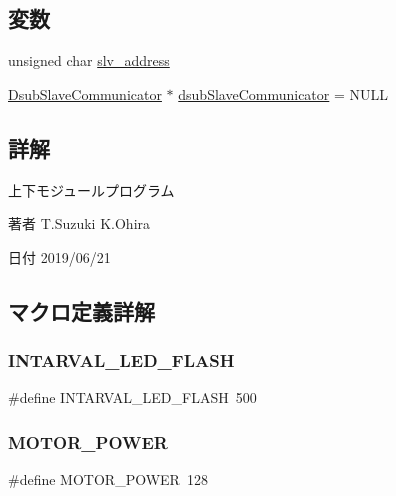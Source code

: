 \subsection*{変数}
\begin{DoxyCompactItemize}
\item 
unsigned char \mbox{\hyperlink{iraira__bo__up__down_8ino_aeba7e981bd419ac0d5ca8e5e4198bf06}{slv\+\_\+address}}
\item 
\mbox{\hyperlink{class_dsub_slave_communicator}{Dsub\+Slave\+Communicator}} $\ast$ \mbox{\hyperlink{iraira__bo__up__down_8ino_adb2253a9db904473e0b317580548c627}{dsub\+Slave\+Communicator}} = N\+U\+LL
\end{DoxyCompactItemize}


\subsection{詳解}
上下モジュールプログラム 

\begin{DoxyAuthor}{著者}
T.\+Suzuki K.\+Ohira 
\end{DoxyAuthor}
\begin{DoxyDate}{日付}
2019/06/21 
\end{DoxyDate}


\subsection{マクロ定義詳解}
\mbox{\label{iraira__bo__up__down_8ino_a6e499958b5cdf86ac62e20b22bbb4bcc}} 
\subsubsection{\texorpdfstring{INTARVAL\_LED\_FLASH}{INTARVAL\_LED\_FLASH}}
{\footnotesize\ttfamily \#define I\+N\+T\+A\+R\+V\+A\+L\+\_\+\+L\+E\+D\+\_\+\+F\+L\+A\+SH~500}

\mbox{\label{iraira__bo__up__down_8ino_aac54a414e7b061922e16432c9437e6b8}} 
\subsubsection{\texorpdfstring{MOTOR\_POWER}{MOTOR\_POWER}}
{\footnotesize\ttfamily \#define M\+O\+T\+O\+R\+\_\+\+P\+O\+W\+ER~128}


